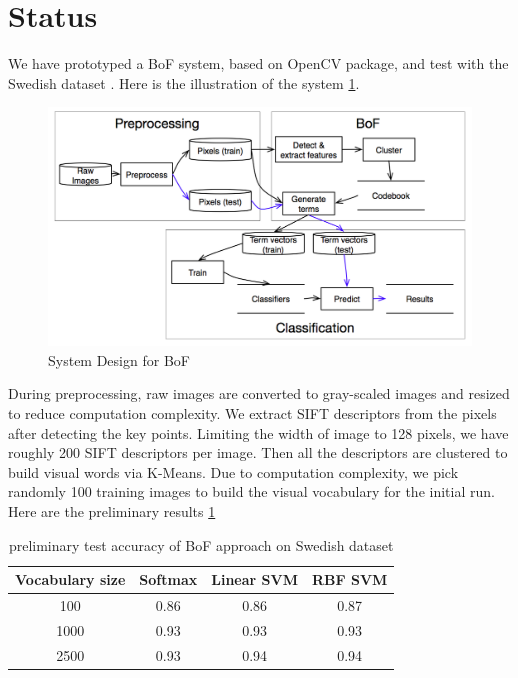 \documentclass{article}
\begin{document}
\section{Status}
We have prototyped a BoF system, based on OpenCV package, and test with the Swedish dataset \cite{SwedishLeafDataset}. Here is the illustration of the system \ref{fig:bofsystemdesign}.
\begin{figure} 
  \centering
  \includegraphics[width=\textwidth]{flowchart}
  \caption{ System Design for BoF }
  \label{fig:bofsystemdesign}
\end{figure}
During preprocessing, raw images are converted to gray-scaled images and resized to reduce computation complexity. We extract SIFT descriptors from the pixels after detecting the key points. Limiting the width of image to 128 pixels, we have roughly 200 SIFT descriptors per image. Then all the descriptors are clustered to build visual words via K-Means. Due to computation complexity, we pick randomly 100 training images to build the visual vocabulary for the initial run.  Here are the preliminary results \ref{table:prelimaryresult}
\begin{table}
  \caption {preliminary test accuracy of BoF approach on Swedish dataset}
  \centering
  \begin{tabular} { c c c c}
    \hline\hline
    Vocabulary size & Softmax &  Linear SVM  & RBF SVM \\
    \hline
    100  &  0.86 & 0.86 & 0.87\\
    1000 &  0.93 & 0.93 & 0.93 \\
    2500 &  0.93 & 0.94 & 0.94 \\
    \hline
  \end{tabular}
  \label{table:prelimaryresult}
\end{table}
\end{document}
